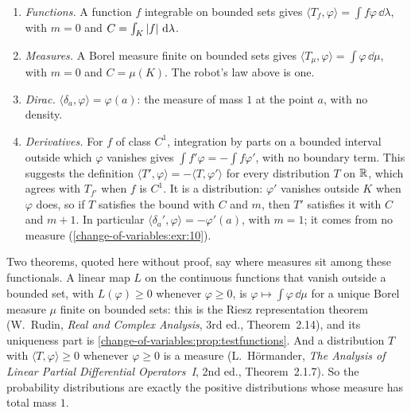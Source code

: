 \begin{notechapter}
\begin{example}\label{change-of-variables:ex:distributions}
\begin{enumerate}[nosep]
  \item \emph{Functions.} A function $f$ integrable on bounded sets
        gives $\langle T_f, \varphi\rangle = \int f\varphi\,\dd\lambda$,
        with $m = 0$ and $C = \int_K\left|f\right|\,\mathrm{d}\lambda$.
  \item \emph{Measures.} A Borel measure finite on bounded sets gives
        $\langle T_\mu, \varphi\rangle = \int\varphi\,\dd\mu$, with
        $m = 0$ and $C = \mu(K)$. The robot's law above is one.
  \item \emph{Dirac.} $\langle\delta_a, \varphi\rangle = \varphi(a)$:
        the measure of mass $1$ at the point $a$, with no density.
  \item \emph{Derivatives.} For $f$ of class $C^1$, integration by parts
        on a bounded interval outside which $\varphi$ vanishes gives
        $\int f'\varphi = -\int f\varphi'$, with no boundary term. This
        suggests the definition
        $\langle T', \varphi\rangle = -\langle T, \varphi'\rangle$ for
        every distribution $T$ on $\mathbb{R}$, which agrees with $T_{f'}$ when
        $f$ is $C^1$. It is a distribution: $\varphi'$ vanishes outside
        $K$ when $\varphi$ does, so if $T$ satisfies the bound with $C$
        and $m$, then $T'$ satisfies it with $C$ and $m + 1$. In particular
        $\langle\delta_a', \varphi\rangle = -\varphi'(a)$, with
        $m = 1$; it comes from no measure
        (\cref{change-of-variables:exr:10}).
\end{enumerate}
\end{example}

Two theorems, quoted here without proof, say where measures sit among
these functionals. A linear map $L$ on the continuous functions that
vanish outside a bounded set, with $L(\varphi)\geq0$ whenever
$\varphi\geq0$, is $\varphi\mapsto\int\varphi\,\dd\mu$ for a unique Borel
measure $\mu$ finite on bounded sets: this is the Riesz representation
theorem (W.~Rudin, \emph{Real and Complex Analysis}, 3rd ed.,
Theorem~2.14), and its uniqueness part is
\cref{change-of-variables:prop:testfunctions}. And a distribution $T$
with $\langle T, \varphi\rangle\geq0$ whenever $\varphi\geq0$ is a
measure (L.~H\"ormander, \emph{The Analysis of Linear Partial
Differential Operators~I}, 2nd ed., Theorem~2.1.7). So the probability
distributions are exactly the positive distributions whose measure has
total mass $1$.


\end{notechapter}
